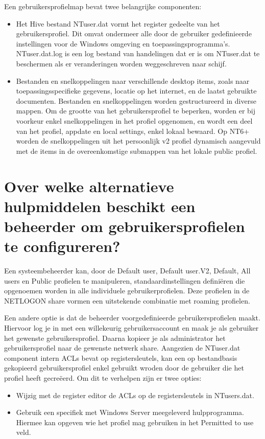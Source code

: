 Een gebruikersprofielmap bevat twee belangrijke componenten:
\begin{itemize}
	\item Het Hive bestand NTuser.dat vormt het register gedeelte van het
		gebruikersprofiel. Dit omvat ondermeer alle door de gebruiker
		gedefinieerde instellingen voor de Windows omgeving en
		toepassingsprogramma's. NTuser.dat.log is een log bestand van
		handelingen dat er is om NTuser.dat te beschermen als er
		veranderingen worden weggeschreven naar schijf.
	\item Bestanden en snelkoppelingen naar verschillende desktop items,
		zoals naar toepassingsspecifieke gegevens, locatie op het
		internet, en de laatst gebruikte documenten. Bestanden en
		snelkoppelingen worden gestructureerd in diverse mappen. Om de
		grootte van het gebruikersprofiel te beperken, worden er bij
		voorkeur enkel snelkoppelingen in het profiel opgenomen, en
		wordt een deel van het profiel, appdate en local settings, enkel
		lokaal bewaard.
		Op NT6+ worden de snelkoppelingen uit het persoonlijk v2 profiel
		dynamisch aangevuld met de items in de overeenkomstige submappen
		van het lokale public profiel.
\end{itemize}

\section{Over welke alternatieve hulpmiddelen beschikt een beheerder om
gebruikersprofielen te configureren?}

Een systeembeheerder kan, door de Default user, Default user.V2, Default, All
users en Public profielen te manipuleren, standaardinstellingen definiëren die
opgenoemen worden in alle individuele gebruikerprofielen. Deze profielen in de
NETLOGON share vormen een uitstekende combinatie met roaming profielen.

Een andere optie is dat de beheerder voorgedefinieerde gebruikersprofielen
maakt. Hiervoor log je in met een willekeurig gebruikersaccount en maak je als
gebruiker het gewenste gebruikersprofiel. Daarna kopieer je als administrator
het gebruikersprofiel naar de gewenste netwerk share. Aangezien de NTuser.dat
component intern ACLs bevat op registersleutels, kan een op bestandbasis
gekopieerd gebruikersprofiel enkel gebruikt wroden door de gebruiker die het
profiel heeft gecreëerd. Om dit te verhelpen zijn er twee opties:
\begin{itemize}
	\item Wijzig met de register editor de ACLs op de registersleutels in
		NTusers.dat.
	\item Gebruik een specifiek met Windows Server meegeleverd
		hulpprogramma. Hiermee kan opgeven wie het profiel mag gebruiken
		in het Permitted to use veld.
\end{itemize}
